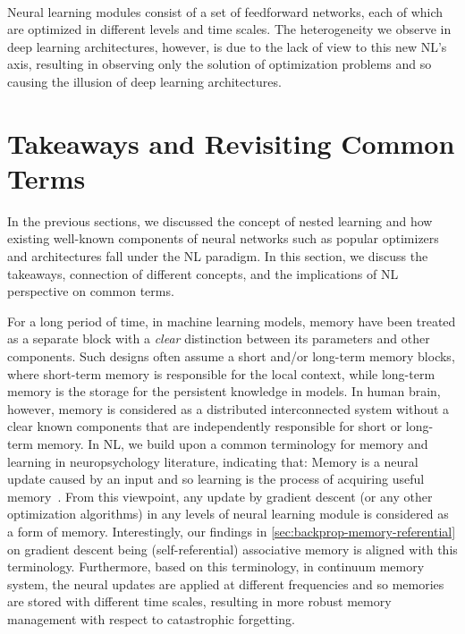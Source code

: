 \documentclass{article}
\newcommand{\citep}{\parencite}
\newcommand{\headred}[1]{\vspace{1.7mm}\noindent{{\textcolor{c5}{\bf #1.}}}}
\begin{document}
{~
~
~
\begin{myboxi}
    Neural learning modules consist of a set of feedforward networks, each of which are optimized in different levels and time scales. The heterogeneity we observe in deep learning architectures, however, is due to the lack of view to this new NL's axis, resulting in observing only the solution of optimization problems and so causing the illusion of deep learning architectures.  
\end{myboxi}

\section{Takeaways and Revisiting Common Terms}\label{sec:revisit}
In the previous sections, we discussed the concept of nested learning and how existing well-known components of neural networks such as popular optimizers and architectures fall under the NL paradigm. In this section, we discuss the takeaways, connection of different concepts, and the implications of NL perspective on common terms. 

\headred{Memory and Learning} For a long period of time, in machine learning models, memory have been treated as a separate block with a \emph{clear} distinction between its parameters and other components. Such designs often assume a short and/or long-term memory blocks, where short-term memory is responsible for the local context, while long-term memory is the storage for the persistent knowledge in models. In human brain, however, memory is considered as a distributed interconnected system without a clear known components that are independently responsible for short or long-term memory. In NL, we build upon a common terminology for memory and learning in neuropsychology literature, indicating that: Memory is a neural update caused by an input and so learning is the process of acquiring useful memory~\citep{okano2000learning}. From this viewpoint, any update by gradient descent (or any other optimization algorithms) in any levels of neural learning module is considered as a form of memory. Interestingly, our findings in \autoref{sec:backprop-memory-referential} on gradient descent being (self-referential) associative memory is aligned with this terminology. Furthermore, based on this terminology, in continuum memory system, the neural updates are applied at different frequencies and so memories are stored with different time scales, resulting in more robust memory management with respect to catastrophic forgetting.  

}
\end{document}

